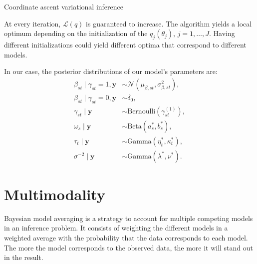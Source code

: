 \documentclass[a4paper, 11pt]{report}
\numberwithin{equation}{chapter}
\begin{document}
\begin{algorithm}
\BlankLine
{}
\BlankLine
{}
\BlankLine
{}
\caption{Coordinate ascent variational inference \label{alg:CAVI}}
\end{algorithm}
At every iteration, $\mathcal{L}(q)$ is guaranteed to increase. The algorithm yields a local optimum depending on the initialization of the $q_j(\theta_j)$, $j=1,\ldots,J$. Having different initializations could yield different optima that correspond to different models.

In our case, the posterior distributions of our model's parameters are:
\begin{align*}
\beta_{st} \mid \gamma_{st} = 1, \boldsymbol{y} &\sim \mathcal{N}\left(\mu_{\beta, st},\sigma^2_{\beta, st}\right),\\
\beta_{st} \mid \gamma_{st} = 0, \boldsymbol{y} &\sim \delta_0,\\
\gamma_{st} \mid \boldsymbol{y} &\sim \text{Bernoulli}(\gamma_{st}^{(1)}),\\
\omega_s\mid\boldsymbol{y} &\sim \text{Beta}(a_s^*,b_s^*),\\
\tau_t\mid \boldsymbol{y} &\sim \text{Gamma}(\eta^*_t, \kappa^*_t),\\
\sigma^{-2} \mid \boldsymbol{y} &\sim \text{Gamma}(\lambda^*, \nu^*).
\end{align*}

\newpage
\chapter{Multimodality}

Bayesian model averaging is a strategy to account for multiple competing models in an inference problem. It consists of weighting the different models in a weighted average with the probability that the data corresponds to each model. The more the model corresponds to the observed data, the more it will stand out in the result.
\end{document}
